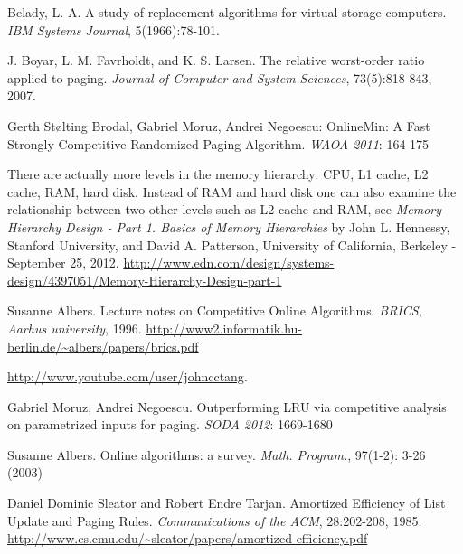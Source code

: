 \documentclass[a4paper,12pt, titlepage]{article}  %
\begin{document}
\newpage
\begin{thebibliography}{99}

	Belady, L. A. A study of replacement algorithms for virtual storage computers. 
        \emph{IBM Systems Journal}, 5(1966):78-101. 
	
	J. Boyar, L. M. Favrholdt, and K. S. Larsen. The relative worst-order ratio applied
	to paging. \emph{Journal of Computer and System Sciences}, 73(5):818-843, 2007.

	Gerth St\o lting Brodal, Gabriel Moruz, Andrei Negoescu: OnlineMin: A Fast Strongly Competitive Randomized Paging Algorithm. 
        \emph{WAOA 2011}: 164-175

	There are actually more levels in the memory hierarchy: CPU, L1 cache, L2 cache, RAM, hard disk.
        Instead of RAM and hard disk one can also examine the relationship between two other levels such as
	L2 cache and RAM,
        see \emph{Memory Hierarchy Design - Part 1. Basics of Memory Hierarchies} by  
	John L. Hennessy, Stanford University, and David A. Patterson, University of California, Berkeley - September 25, 2012.
	\url{http://www.edn.com/design/systems-design/4397051/Memory-Hierarchy-Design-part-1}	

          Susanne Albers. Lecture notes on Competitive Online Algorithms. 
          \emph{BRICS, Aarhus university}, 1996.  
          \url{http://www2.informatik.hu-berlin.de/~albers/papers/brics.pdf}
  
	  \url{http://www.youtube.com/user/johncctang}.

        Gabriel Moruz, Andrei Negoescu. Outperforming LRU via competitive analysis on parametrized inputs for paging. \emph{SODA 2012}: 1669-1680

        Susanne Albers. Online algorithms: a survey. \emph{Math. Program.}, 97(1-2): 3-26 (2003)

         Daniel Dominic Sleator and Robert Endre Tarjan. Amortized Efficiency of List Update and Paging Rules.
         \emph{Communications of the ACM}, 28:202-208, 1985. \url{http://www.cs.cmu.edu/~sleator/papers/amortized-efficiency.pdf}


\end{thebibliography}
\end{document}
